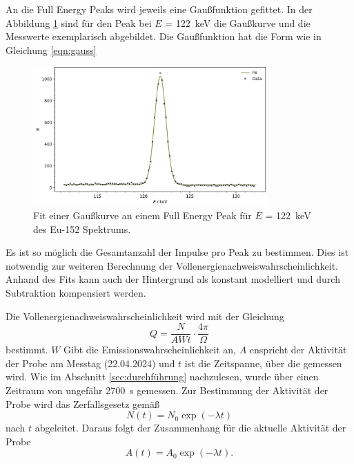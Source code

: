 An die Full Energy Peaks wird jeweils eine Gaußfunktion gefittet. In der Abbildung \ref{fig:plot4} sind für den Peak bei $E$ = \qty{122}{\kilo\eV}
die Gaußkurve und die Messwerte exemplarisch abgebildet. Die Gaußfunktion hat die Form wie in Gleichung \ref{eqn:gauss}

\begin{figure}[H]
    \centering
    \includegraphics[width=0.8\textwidth]{content/plots/plot4.jpg}
   \caption{Fit einer Gaußkurve an einem Full Energy Peak für $E$ = \qty{122}{\kilo\eV} des Eu-152 Spektrums.}
   \label{fig:plot4}
\end{figure}

Es ist so möglich die Gesamtanzahl der Impulse pro Peak zu bestimmen. Dies ist notwendig zur weiteren Berechnung der Vollenergienachweiswahrscheinlichkeit.
Anhand des Fits kann auch der Hintergrund als konstant modelliert und durch Subtraktion kompensiert werden.

Die Vollenergienachweiswahrscheinlichkeit wird mit der Gleichung 
\begin{equation*}
    Q = \frac{N}{AWt} \cdot \frac{4\pi}{\Omega}
\end{equation*}
bestimmt. $W$ Gibt die Emissionswahrscheinlichkeit an, $A$ enspricht der Aktivität der Probe am Messtag (22.04.2024) und $t$
ist die Zeitspanne, über die gemessen wird. Wie im Abschnitt \ref{sec:durchführung} nachzulesen, wurde über einen Zeitraum von ungefähr \qty{2700}{\second} gemessen.
Zur Bestimmung der Aktivität der Probe wird das Zerfallsgesetz gemäß
\begin{equation*}
    N(t) = N_0 \exp(-\lambda t)
\end{equation*}
nach $t$ abgeleitet. Daraus folgt der Zusammenhang für die aktuelle Aktivität der Probe
\begin{equation*}
    A(t) = A_0 \exp(-\lambda t).
\end{equation*}

